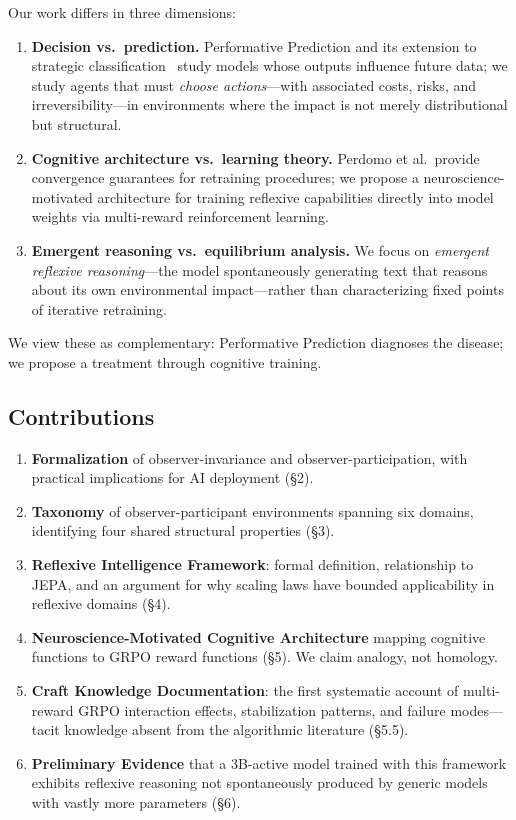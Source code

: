 \documentclass[11pt,a4paper]{article}
\begin{document}
Our work differs in three dimensions:

\begin{enumerate}[leftmargin=*]
\item \textbf{Decision vs.\ prediction.} Performative Prediction and its extension to strategic classification~\citep{hardt2016} study models whose outputs influence future data; we study agents that must \textit{choose actions}---with associated costs, risks, and irreversibility---in environments where the impact is not merely distributional but structural.
\item \textbf{Cognitive architecture vs.\ learning theory.} Perdomo et al.\ provide convergence guarantees for retraining procedures; we propose a neuroscience-motivated architecture for training reflexive capabilities directly into model weights via multi-reward reinforcement learning.
\item \textbf{Emergent reasoning vs.\ equilibrium analysis.} We focus on \textit{emergent reflexive reasoning}---the model spontaneously generating text that reasons about its own environmental impact---rather than characterizing fixed points of iterative retraining.
\end{enumerate}

We view these as complementary: Performative Prediction diagnoses the disease; we propose a treatment through cognitive training.

\subsection{Contributions}

\begin{enumerate}[leftmargin=*]
\item \textbf{Formalization} of observer-invariance and observer-participation, with practical implications for AI deployment (\S2).
\item \textbf{Taxonomy} of observer-participant environments spanning six domains, identifying four shared structural properties (\S3).
\item \textbf{Reflexive Intelligence Framework}: formal definition, relationship to JEPA, and an argument for why scaling laws have bounded applicability in reflexive domains (\S4).
\item \textbf{Neuroscience-Motivated Cognitive Architecture} mapping cognitive functions to GRPO reward functions (\S5). We claim analogy, not homology.
\item \textbf{Craft Knowledge Documentation}: the first systematic account of multi-reward GRPO interaction effects, stabilization patterns, and failure modes---tacit knowledge absent from the algorithmic literature (\S5.5).
\item \textbf{Preliminary Evidence} that a 3B-active model trained with this framework exhibits reflexive reasoning not spontaneously produced by generic models with vastly more parameters (\S6).
\end{enumerate}
\end{document}
